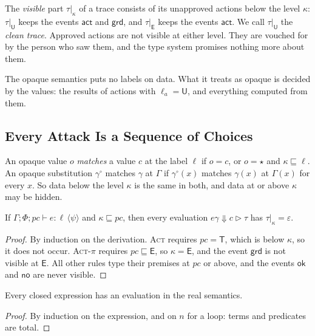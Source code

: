\documentclass[acmsmall,nonacm,screen]{acmart}
\newcommand{\kw}[1]{\mathsf{#1}}
\newcommand{\T}{\kw{T}}
\newcommand{\E}{\kw{E}}
\newcommand{\U}{\kw{U}}
\newcommand{\ev}[3]{#1 \Downarrow #2 \triangleright #3}
\newcommand{\eps}{\varepsilon}
\newcommand{\op}{\star}
\newcommand{\ty}[4]{\Gamma; #1; #2 \vdash #3 : #4}
\newcommand{\post}[1]{\langle #1 \rangle}
\newcommand{\vis}[2]{#1|_{#2}}
\begin{document}
The \emph{visible} part $\vis{\tau}{\kappa}$ of a trace consists of its unapproved actions
below the level $\kappa$: $\vis{\tau}{\U}$ keeps the events $\kw{act}$ and $\kw{grd}$, and
$\vis{\tau}{\E}$ keeps the events $\kw{act}$. We call $\vis{\tau}{\U}$ the \emph{clean
trace}. Approved actions are not visible at either level. They are vouched for by the person
who saw them, and the type system promises nothing more about them.

The opaque semantics puts no labels on data. What it treats as opaque is decided by the
values: the results of actions with $\ell_a = \U$, and everything computed from them.

\subsection{Every Attack Is a Sequence of Choices}

An opaque value $o$ \emph{matches} a value $c$ at the label $\ell$ if $o = c$, or $o = \op$
and $\kappa \sqsubseteq \ell$. An opaque substitution $\gamma^\circ$ matches $\gamma$ at
$\Gamma$ if $\gamma^\circ(x)$ matches $\gamma(x)$ at $\Gamma(x)$ for every $x$. So data below
the level $\kappa$ is the same in both, and data at or above $\kappa$ may be hidden.

\begin{lemma}[Quiet]
\label{lem:quiet}
If $\ty{\Phi}{pc}{e}{\ell\,\post{\psi}}$ and $\kappa \sqsubseteq pc$, then every evaluation
$\ev{e\gamma}{c}{\tau}$ has $\vis{\tau}{\kappa} = \eps$.
\end{lemma}

\begin{proof}
By induction on the derivation. \textsc{Act} requires $pc = \T$, which is below $\kappa$, so
it does not occur. \textsc{Act-$\pi$} requires $pc \sqsubseteq \E$, so $\kappa = \E$, and the
event $\kw{grd}$ is not visible at $\E$. All other rules type their premises at $pc$ or
above, and the events $\kw{ok}$ and $\kw{no}$ are never visible.
\end{proof}

\begin{lemma}[Totality]
\label{lem:total}
Every closed expression has an evaluation in the real semantics.
\end{lemma}

\begin{proof}
By induction on the expression, and on $n$ for a loop: terms and predicates are total.
\end{proof}
\end{document}
